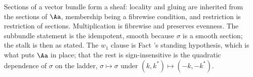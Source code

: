 Sections of a vector bundle form a sheaf: locality and gluing are inherited from the sections of $\Aa$, membership being a fibrewise condition, and restriction is restriction of sections. Multiplication is fibrewise and preserves evenness. The subbundle statement is the idempotent, smooth because $\sigma$ is a smooth section; the stalk is then as stated. The $w_1$ clause is Fact 's standing hypothesis, which is what puts $\Aa$ in place; that the rest is sign-insensitive is the quadratic dependence of $\sigma$ on the ladder, $\sigma \mapsto \sigma$ under $(k, k^{*}) \mapsto (-k, -k^{*})$.

